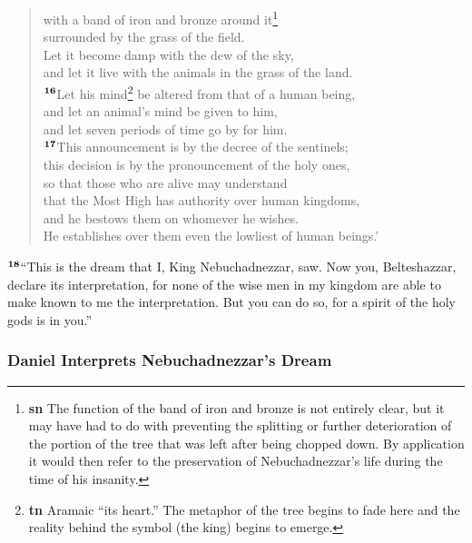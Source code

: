\documentclass[12pt,a4paper,final]{article}
\renewcommand{\textsuperscript}[1]{\ensuremath{^{\textbf{\scriptsize #1}}}}
\begin{document}
\begin{quotation}
with a band of iron and bronze around it\footnote{\textbf{sn} The function of the band of iron and bronze is not entirely clear, but it may have had to do with preventing the splitting or further deterioration of the portion of the tree that was left after being chopped down. By application it would then refer to the preservation of Nebuchadnezzar’s life during the time of his insanity.} \\
surrounded by the grass of the field. \\
Let it become damp with the dew of the sky, \\
and let it live with the animals in the grass of the land. \\
\textsuperscript{16}Let his mind\footnote{\textbf{tn} Aramaic “its heart.” The metaphor of the tree begins to fade here and the reality behind the symbol (the king) begins to emerge.} be altered from that of a human being, \\
and let an animal’s mind be given to him, \\
and let seven periods of time go by for him. \\
\textsuperscript{17}This announcement is by the decree of the sentinels; \\
this decision is by the pronouncement of the holy ones, \\
so that those who are alive may understand \\
that the Most High has authority over human kingdoms, \\
and he bestows them on whomever he wishes. \\
He establishes over them even the lowliest of human beings.’ \\

\end{quotation}
\textsuperscript{18}“This is the dream that I, King Nebuchadnezzar, saw. Now you, Belteshazzar, declare its interpretation, for none of the wise men in my kingdom are able to make known to me the interpretation. But you can do so, for a spirit of the holy gods is in you.” 


\subsubsection*{Daniel Interprets Nebuchadnezzar’s Dream}
\end{document}
